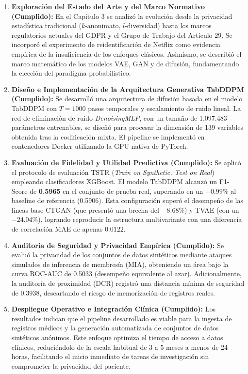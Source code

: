 \begin{enumerate}
    \item \textbf{Exploración del Estado del Arte y del Marco Normativo (Cumplido):} En el Capítulo 3 se analizó la evolución desde la privacidad estadística tradicional ($k$-anonimato, $l$-diversidad) hasta los marcos regulatorios actuales del GDPR y el Grupo de Trabajo del Artículo 29. Se incorporó el experimento de reidentificación de Netflix \parencite{narayanan2008netflix} como evidencia empírica de la insuficiencia de los enfoques clásicos. Asimismo, se describió el marco matemático de los modelos VAE, GAN y de difusión, fundamentando la elección del paradigma probabilístico.
    
    \item \textbf{Diseño e Implementación de la Arquitectura Generativa TabDDPM (Cumplido):} Se desarrolló una arquitectura de difusión basada en el modelo TabDDPM con $T=1000$ pasos temporales y escalamiento de ruido lineal. La red de eliminación de ruido \textit{DenoisingMLP}, con un tamaño de 1.097.483 parámetros entrenables, se diseñó para procesar la dimensión de 139 variables obtenida tras la codificación mixta. El pipeline se implementó en contenedores Docker utilizando la GPU nativa de PyTorch.
    
    \item \textbf{Evaluación de Fidelidad y Utilidad Predictiva (Cumplido):} Se aplicó el protocolo de evaluación TSTR (\textit{Train on Synthetic, Test on Real}) empleando clasificadores XGBoost. El modelo TabDDPM alcanzó un F1-Score de \textbf{0.5965} en el conjunto de prueba real, superando en un $+0.99\%$ al baseline de referencia (0.5906). Esta configuración superó el desempeño de las líneas base CTGAN (que presentó una brecha del $-8.68\%$) y TVAE (con un $-24.04\%$), logrando reproducir la estructura multivariante con una diferencia de correlación MAE de apenas $0.0122$.
    
    \item \textbf{Auditoría de Seguridad y Privacidad Empírica (Cumplido):} Se evaluó la privacidad de los conjuntos de datos sintéticos mediante ataques simulados de inferencia de membresía (MIA), obteniendo un área bajo la curva ROC-AUC de 0.5033 (desempeño equivalente al azar). Adicionalmente, la auditoría de proximidad (DCR) registró una distancia mínima de seguridad de 0.3938, descartando el riesgo de memorización de registros reales.
    
    \item \textbf{Despliegue Operativo e Integración Clínica (Cumplido):} Los resultados indican que el pipeline desarrollado es viable para la ingesta de registros médicos y la generación automatizada de conjuntos de datos sintéticos anónimos. Este enfoque optimiza el tiempo de acceso a datos clínicos, reduciéndolo de la escala habitual de 3 a 5 meses a menos de 24 horas, facilitando el inicio inmediato de tareas de investigación sin comprometer la privacidad del paciente.
\end{enumerate}


